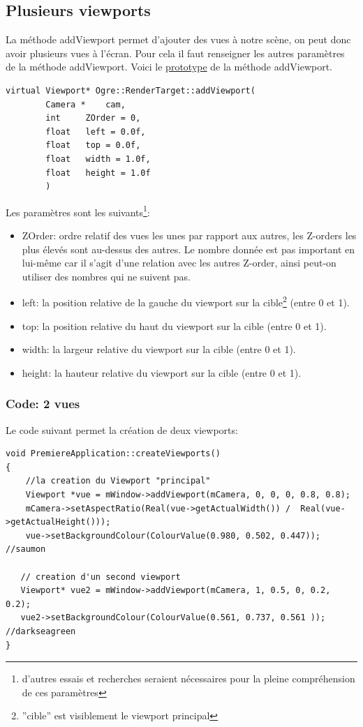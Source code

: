 \subsection{Plusieurs viewports}
La méthode addViewport permet d'ajouter des vues à notre scène, on peut donc avoir plusieurs vues à l'écran. Pour cela il faut renseigner les autres paramètres de la méthode addViewport.\newline
Voici le \href{http://www.ogre3d.org/docs/api/1.9/classOgre_1_1RenderTarget.html#a1a558e64db9dfd7cc4cec4547fca0e39}{prototype} de la méthode addViewport.


\begin{lstlisting}[caption={Prototype de addViewport}]
virtual Viewport* Ogre::RenderTarget::addViewport(
	 	Camera *  	cam,
		int  	ZOrder = 0,
		float  	left = 0.0f,
		float  	top = 0.0f,
		float  	width = 1.0f,
		float  	height = 1.0f 
		) 
\end{lstlisting}

Les paramètres sont les suivants\footnote{d'autres essais et recherches seraient nécessaires pour la pleine compréhension de ces paramètres}:
\begin{itemize}
\item ZOrder: ordre relatif des vues les unes par rapport aux autres, les Z-orders les plus élevés sont au-dessus des autres. Le nombre donnée est pas important en lui-même car il s'agit d'une relation avec les autres Z-order, ainsi peut-on utiliser des nombres qui ne suivent pas.
\item left: la position relative de la gauche du viewport sur la cible\footnote{''cible'' est visiblement le viewport principal} (entre 0 et 1).
\item top: la position relative du haut du viewport sur la cible (entre 0 et 1).
\item width: la largeur relative du viewport sur la cible (entre 0 et 1).
\item height: la hauteur relative du viewport sur la cible (entre 0 et 1).
\end{itemize}


	
\subsubsection{Code: 2 vues}
Le code suivant permet la création de deux viewports:


\begin{lstlisting}[caption={createViewports: création de plusieurs vues}]
void PremiereApplication::createViewports()
{
    //la creation du Viewport "principal"
    Viewport *vue = mWindow->addViewport(mCamera, 0, 0, 0, 0.8, 0.8);
    mCamera->setAspectRatio(Real(vue->getActualWidth()) /  Real(vue->getActualHeight()));
    vue->setBackgroundColour(ColourValue(0.980, 0.502, 0.447)); //saumon

   // creation d'un second viewport
   Viewport* vue2 = mWindow->addViewport(mCamera, 1, 0.5, 0, 0.2, 0.2);
   vue2->setBackgroundColour(ColourValue(0.561, 0.737, 0.561 ));  //darkseagreen
}
\end{lstlisting}

